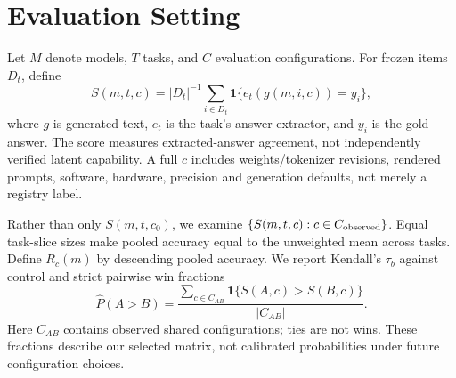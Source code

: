 \section{Evaluation Setting}
Let $M$ denote models, $T$ tasks, and $C$ evaluation configurations. For frozen items $D_t$, define
\[
 S(m,t,c)=|D_t|^{-1}\sum_{i\in D_t}\mathbf{1}\{e_t(g(m,i,c))=y_i\},
\]
where $g$ is generated text, $e_t$ is the task's answer extractor, and $y_i$ is the gold answer. The score measures extracted-answer agreement, not independently verified latent capability. A full $c$ includes weights/tokenizer revisions, rendered prompts, software, hardware, precision and generation defaults, not merely a registry label.

Rather than only $S(m,t,c_0)$, we examine $\{S(m,t,c):c\in C_{\rm observed}\}$. Equal task-slice sizes make pooled accuracy equal to the unweighted mean across tasks. Define $R_c(m)$ by descending pooled accuracy. We report Kendall's $\tau_b$ against control and strict pairwise win fractions
\[
 \widehat P(A>B)=\frac{\sum_{c\in C_{AB}}\mathbf{1}\{S(A,c)>S(B,c)\}}{|C_{AB}|}.
\]
Here $C_{AB}$ contains observed shared configurations; ties are not wins. These fractions describe our selected matrix, not calibrated probabilities under future configuration choices.
